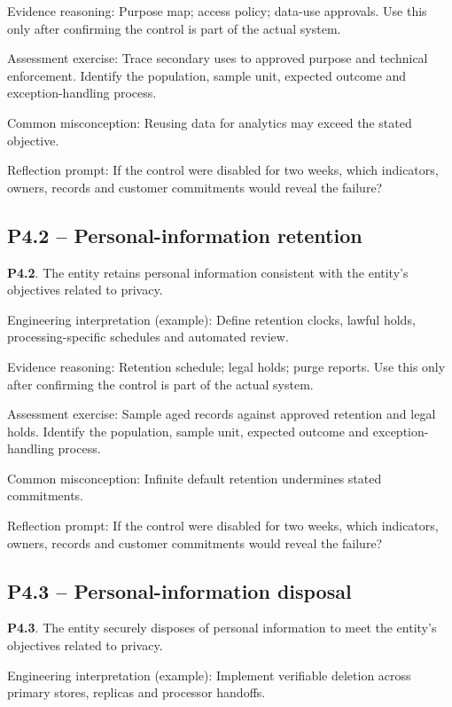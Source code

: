 \documentclass[10pt,oneside]{report}
\begin{document}
Evidence reasoning: Purpose map; access policy; data-use approvals. Use this only after confirming the control is part of the actual system.

Assessment exercise: Trace secondary uses to approved purpose and technical enforcement. Identify the population, sample unit, expected outcome and exception-handling process.

Common misconception: Reusing data for analytics may exceed the stated objective.

Reflection prompt: If the control were disabled for two weeks, which indicators, owners, records and customer commitments would reveal the failure?

\subsection{P4.2 -- Personal-information retention}
\begin{aicpabox}
\textbf{P4.2}. The entity retains personal information consistent with the entity's objectives related to privacy.\par{}
\end{aicpabox}
Engineering interpretation (example): Define retention clocks, lawful holds, processing-specific schedules and automated review.

Evidence reasoning: Retention schedule; legal holds; purge reports. Use this only after confirming the control is part of the actual system.

Assessment exercise: Sample aged records against approved retention and legal holds. Identify the population, sample unit, expected outcome and exception-handling process.

Common misconception: Infinite default retention undermines stated commitments.

Reflection prompt: If the control were disabled for two weeks, which indicators, owners, records and customer commitments would reveal the failure?

\subsection{P4.3 -- Personal-information disposal}
\begin{aicpabox}
\textbf{P4.3}. The entity securely disposes of personal information to meet the entity's objectives related to privacy.\par{}
\end{aicpabox}
Engineering interpretation (example): Implement verifiable deletion across primary stores, replicas and processor handoffs.
\end{document}
